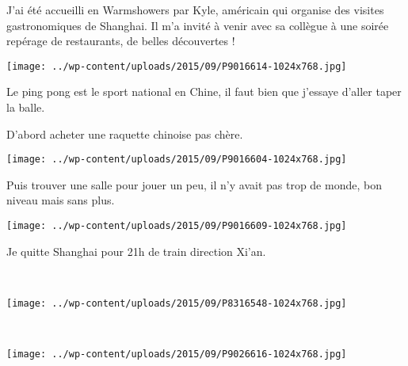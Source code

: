  J'ai été accueilli en Warmshowers par Kyle, américain qui organise des visites gastronomiques de Shanghai. Il m'a invité à venir avec sa collègue à une soirée repérage de restaurants, de belles découvertes ! 
\begin{center} \texttt{[image: ../wp-content/uploads/2015/09/P9016614-1024x768.jpg]} \end{center}
\vspace{-\topsep}
\pagebreak

 Le ping pong est le sport national en Chine, il faut bien que j'essaye d'aller taper la balle.

 D'abord acheter une raquette chinoise pas chère.
\begin{center} \texttt{[image: ../wp-content/uploads/2015/09/P9016604-1024x768.jpg]} \end{center}

 Puis trouver une salle pour jouer un peu, il n'y avait pas trop de monde, bon niveau mais sans plus.
\begin{center} \texttt{[image: ../wp-content/uploads/2015/09/P9016609-1024x768.jpg]} \end{center}
\vspace{-\topsep}
\pagebreak

 Je quitte Shanghai pour 21h de train direction Xi'an.\\
 \vspace{0.5mm}
 
 \vfill
 ~
 \vfill
\begin{center} \texttt{[image: ../wp-content/uploads/2015/09/P8316548-1024x768.jpg]} \end{center}

\vfill
~\\
\vfill
\begin{center} \texttt{[image: ../wp-content/uploads/2015/09/P9026616-1024x768.jpg]} \end{center}
\vspace{-\topsep}
\vspace{-0.75mm}
